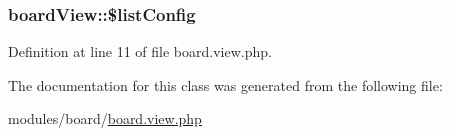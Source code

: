 \hypertarget{classboardView_a8d64b7032d159a960972ae38f76897f8}{}
\subsubsection[{\$list\+Config}]{\setlength{\rightskip}{0pt plus 5cm}board\+View\+::\$list\+Config}\label{classboardView_a8d64b7032d159a960972ae38f76897f8}


Definition at line 11 of file board.\+view.\+php.



The documentation for this class was generated from the following file\+:\begin{DoxyCompactItemize}
\item 
modules/board/\hyperlink{board_8view_8php}{board.\+view.\+php}\end{DoxyCompactItemize}
